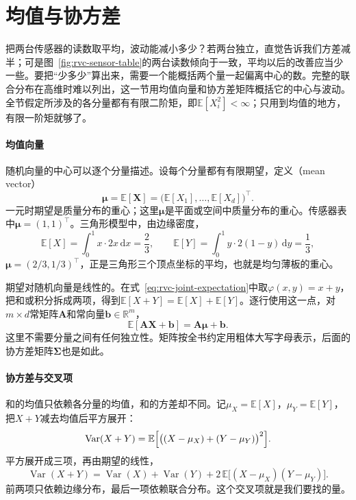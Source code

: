 \section{均值与协方差}
\label{sec:rvc-moments}

把两台传感器的读数取平均，波动能减小多少？若两台独立，直觉告诉我们方差减半；可是图~\ref{fig:rvc-sensor-table}的两台读数倾向于一致，平均以后的改善应当少一些。要把“少多少”算出来，需要一个能概括两个量一起偏离中心的数。完整的联合分布在高维时难以列出，这一节用均值向量和协方差矩阵概括它的中心与波动。全节假定所涉及的各分量都有有限二阶矩，即$\mathbb{E}[X_i^{2}]<\infty$；只用到均值的地方，有限一阶矩就够了。

\paragraph{均值向量}
随机向量的中心可以逐个分量描述。设每个分量都有有限期望，定义（mean vector）
\begin{equation}
 \bm{\mu}=\mathbb{E}[\bm{X}]=\bigl(\mathbb{E}[X_1],\dots,\mathbb{E}[X_d]\bigr)^{\top}.
 \label{eq:rvc-mean-vector}
\end{equation}
一元时期望是质量分布的重心；这里$\bm{\mu}$是平面或空间中质量分布的重心。传感器表中$\bm{\mu}=(1,1)^{\top}$。三角形模型中，由边缘密度，
\[
 \mathbb{E}[X]=\int_{0}^{1}x\cdot 2x\,\mathrm{d}x=\frac23,\qquad \mathbb{E}[Y]=\int_{0}^{1}y\cdot 2(1-y)\,\mathrm{d}y=\frac13,
\]
$\bm{\mu}=(2/3,1/3)^{\top}$，正是三角形三个顶点坐标的平均，也就是均匀薄板的重心。

期望对随机向量是线性的。在式~\eqref{eq:rvc-joint-expectation}中取$\varphi(x,y)=x+y$，把和或积分拆成两项，得到$\mathbb{E}[X+Y]=\mathbb{E}[X]+\mathbb{E}[Y]$。逐行使用这一点，对$m\times d$常矩阵$\bm{A}$和常向量$\bm{b}\in\mathbb{R}^{m}$，
\begin{equation}
 \mathbb{E}[\bm{A}\bm{X}+\bm{b}]=\bm{A}\bm{\mu}+\bm{b}.
 \label{eq:rvc-mean-affine}
\end{equation}
这里不需要分量之间有任何独立性。矩阵按全书约定用粗体大写字母表示，后面的协方差矩阵$\bm{\Sigma}$也是如此。

\paragraph{协方差与交叉项}
和的均值只依赖各分量的均值，和的方差却不同。记$\mu_X=\mathbb{E}[X]$，$\mu_Y=\mathbb{E}[Y]$，把$X+Y$减去均值后平方展开：
\[
 \operatorname{Var}(X+Y)=\mathbb{E}\Bigl[\bigl((X-\mu_X)+(Y-\mu_Y)\bigr)^{2}\Bigr].
\]
平方展开成三项，再由期望的线性，
\[
 \operatorname{Var}(X+Y)=\operatorname{Var}(X)+\operatorname{Var}(Y)+2\,\mathbb{E}\bigl[(X-\mu_X)(Y-\mu_Y)\bigr].
\]
前两项只依赖边缘分布，最后一项依赖联合分布。这个交叉项就是我们要找的量。

